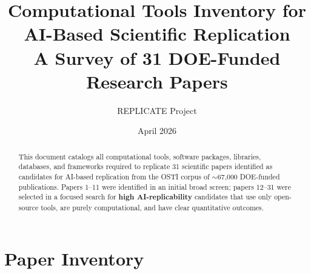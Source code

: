 \documentclass[11pt,letterpaper]{article}
\title{\textbf{Computational Tools Inventory for\\AI-Based Scientific Replication}\\[6pt]
\large A Survey of 31 DOE-Funded Research Papers}
\author{REPLICATE Project}
\date{April 2026}
\begin{document}
\maketitle

\begin{abstract}
This document catalogs all computational tools, software packages, libraries, databases, and frameworks required to replicate 31 scientific papers identified as candidates for AI-based replication from the OSTI corpus of ${\sim}$67,000 DOE-funded publications.
Papers 1--11 were identified in an initial broad screen; papers 12--31 were selected in a focused search for \textbf{high AI-replicability} candidates that use only open-source tools, are purely computational, and have clear quantitative outcomes.
\end{abstract}

\tableofcontents
\newpage

\section{Paper Inventory}
\end{document}
